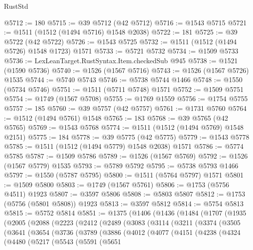 \begin{lexlean}{RustStd}
\begin{coremodule}
{{@5712 := 180
@5715 := @39 @5712 (@42 @5712)
@5716 := @1543 @5715
@5721 := @1511 (@1512 (@1494 @5716) @1548 @2038)
@5722 := 181
@5725 := @39 @5722 (@42 @5722)
@5726 := @1543 @5725
@5732 := @1511 (@1512 (@1494 @5726) @1548 @1723) @1571
@5733 := @5721 @5732
@5734 := @1509 @5733
@5736 := LexLeanTarget.RustSyntax.Item.checkedSub @945
@5738 := @1521 (@1590 @5736)
@5740 := @1526 (@1567 @5716)
@5743 := @1526 (@1567 @5726) @1535
@5744 := @5740 @5743
@5746 := @5738 @5744 @1466
@5748 := @1550 (@5734 @5746)
@5751 := @1511 (@5711 @5748) @1571
@5752 := @1509 @5751
@5754 := @1749 (@1567 @5708)
@5755 := @1769 @1559
@5756 := @1754 @5755
@5757 := 185
@5760 := @39 @5757 (@42 @5757)
@5761 := @1731 @5760
@5764 := @1512 (@1494 @5761) @1548
@5765 := 183
@5768 := @39 @5765 (@42 @5765)
@5769 := @1543 @5768
@5774 := @1511 (@1512 (@1494 @5769) @1548 @2151)
@5775 := 184
@5778 := @39 @5775 (@42 @5775)
@5779 := @1543 @5778
@5785 := @1511 (@1512 (@1494 @5779) @1548 @2038) @1571
@5786 := @5774 @5785
@5787 := @1509 @5786
@5789 := @1526 (@1567 @5769)
@5792 := @1526 (@1567 @5779) @1535
@5793 := @5789 @5792
@5795 := @5738 @5793 @1466
@5797 := @1550 (@5787 @5795)
@5800 := @1511 (@5764 @5797) @1571
@5801 := @1509 @5800
@5803 := @1749 (@1567 @5761)
@5806 := @1753 (@5756 @4511) @1923
@5807 := @3597 @5806
@5808 := @5803 @5807
@5812 := @1753 (@5756 (@5801 @5808)) @1923
@5813 := @3597 @5812
@5814 := @5754 @5813
@5815 := @5752 @5814
@5851 := @1375
    (@1406
      (@1436
        (@1484
          (@1707
            (@1935
              (@2005
                (@2088
                  (@2223
                    (@2412
                      (@2489
                        (@3083
                          (@3114
                            (@3211
                              (@3374
                                (@3505
                                  (@3641
                                    (@3654
                                      (@3736
                                        (@3789
                                          (@3886
                                            (@4012
                                              (@4077
                                                (@4151
                                                  (@4238
                                                    (@4324
                                                      (@4480
                                                        (@5217
                                                          (@5543
                                                            (@5591
                                                              (@5651
}}
\end{coremodule}
\end{lexlean}
